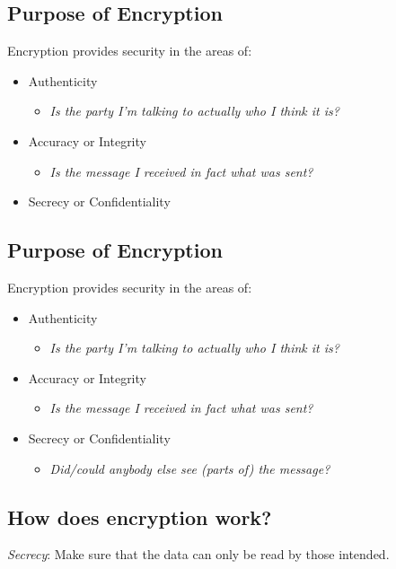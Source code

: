 \documentclass[xga]{xdvislides}
\begin{document}
\subsection{Purpose of Encryption}
Encryption provides security in the areas of:
\begin{itemize}
	\item Authenticity
		\begin{itemize}
			\item {\em Is the party I'm talking to actually who I {\em think} it is?}
		\end{itemize}
	\item Accuracy or Integrity
		\begin{itemize}
			\item {\em Is the message I received in fact what was sent?}
		\end{itemize}
	\item Secrecy or Confidentiality
\end{itemize}

\subsection{Purpose of Encryption}
Encryption provides security in the areas of:
\begin{itemize}
	\item Authenticity
		\begin{itemize}
			\item {\em Is the party I'm talking to actually who I {\em think} it is?}
		\end{itemize}
	\item Accuracy or Integrity
		\begin{itemize}
			\item {\em Is the message I received in fact what was sent?}
		\end{itemize}
	\item Secrecy or Confidentiality
		\begin{itemize}
			\item {\em Did/could anybody else see (parts of) the message?}
		\end{itemize}
\end{itemize}


\subsection{How does encryption work?}
{\em Secrecy}:  Make sure that the data can only be read by those intended.
\end{document}
